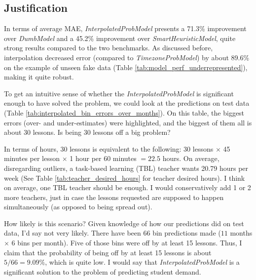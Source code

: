 \documentclass[oneside]{article}
\begin{document}
\subsection{Justification}

In terms of average MAE, \emph{InterpolatedProbModel} presents a 71.3\%
improvement over \emph{DumbModel} and a 45.2\% improvement over
\emph{SmartHeuristicModel}, quite strong results compared to the two
benchmarks. As discussed before, interpolation decreased error (compared to
\emph{TimezoneProbModel}) by about 89.6\% on the example of unseen fake data
(Table \ref{tab:model_perf_underrepresented}), making it quite robust.

To get an intuitive sense of whether the \emph{InterpolatedProbModel} is
significant enough to have solved the problem, we could look at the predictions
on test data (Table \ref{tab:interpolated_bin_errors_over_months}). On this
table, the biggest errors (over- and under-estimates) were highlighted, and the
biggest of them all is about 30 lessons. Is being 30 lessons off a big problem?

In terms of hours, 30 lessons is equivalent to the following: 30 lessons
$\times$ 45 minutes per lesson $\times$ 1 hour per 60 minutes $ = 22.5$ hours.
On average, disregarding outliers, a task-based learning (TBL) teacher wants
20.79 hours per week (See Table \ref{tab:teacher_desired_hours} for teacher
desired hours). I think on average, one TBL teacher should be enough. I would
conservatively add 1 or 2 more teachers, just in case the lessons requested are
supposed to happen simultaneously (as opposed to being spread out).

How likely is this scenario? Given knowledge of how our predictions did on test
data, I'd say not very likely. There have been 66 bin predictions made ($11$
months $\times$ 6 bins per month). Five of those bins were off by at least 15
lessons. Thus, I claim that the probability of being off by at least 15 lessons
is about $5/66 = 9.09\%$, which is quite low. I would say that
\emph{InterpolatedProbModel} is a significant solution to the problem of
predicting student demand.
\end{document}
